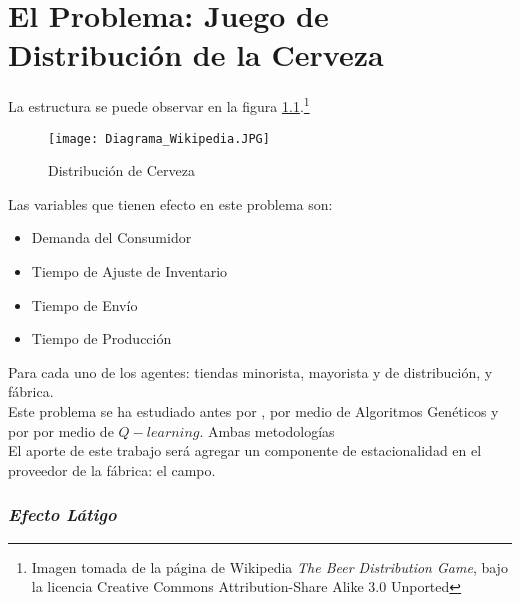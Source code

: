\chapter{El Problema: Juego de Distribuci\'on de la Cerveza}





La estructura se puede observar en la figura \ref{diagram_wikipedia}.\footnote{Imagen tomada de la página de Wikipedia \textit{The Beer Distribution Game}, bajo la licencia Creative Commons Attribution-Share Alike 3.0 Unported}\\


\begin{figure}[h]
\caption{Distribución de Cerveza}
\label{diagram_wikipedia}
\texttt{[image: Diagrama\_Wikipedia.JPG]}
\centering
\end{figure}

Las variables que tienen efecto en este problema son:
\begin{itemize}
    \item Demanda del Consumidor
    \item Tiempo de Ajuste de Inventario
    \item Tiempo de Envío
    \item Tiempo de Producción
\end{itemize}

Para cada uno de los agentes: tiendas minorista, mayorista y de distribución, y fábrica.\\

Este problema se ha estudiado antes por \citet{Strozzi}, por medio de Algoritmos Genéticos y por \citet{Chaharsooghi} por medio de $Q-learning$. Ambas metodolog\'ias \\

El aporte de este trabajo será agregar un componente de estacionalidad en el proveedor de la fábrica: el campo.

\subsection{\textit{Efecto Látigo}}

